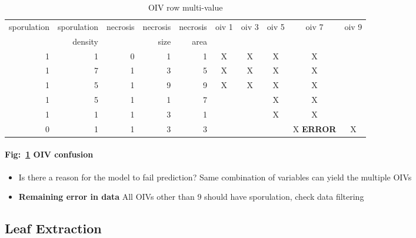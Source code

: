 \documentclass[english]{article}
\begin{document}
\begin{table}[H]
	\centering
	\caption{OIV row multi-value}\label{tab:oivconfusion}
	\begin{tabular}{rrrrrccccc}
		\toprule
		sporulation & sporulation & necrosis & necrosis & necrosis & oiv 1 & oiv 3 & oiv 5 & oiv 7            & oiv 9 \\
		{}          & density     & {}       & size     & area     & {}    & {}    & {}    & {}               & {}    \\
		\midrule
		1           & 1           & 0        & 1        & 1        & X     & X     & X     & X                &       \\
		1           & 7           & 1        & 3        & 5        & X     & X     & X     & X                &       \\
		1           & 5           & 1        & 9        & 9        & X     & X     & X     & X                &       \\
		1           & 5           & 1        & 1        & 7        &       &       & X     & X                &       \\
		1           & 1           & 1        & 3        & 1        &       &       & X     & X                &       \\
		0           & 1           & 1        & 3        & 3        &       &       &       & X \textbf{ERROR} & X     \\
		\bottomrule
	\end{tabular}
\end{table}
\paragraph{Fig:~\ref{tab:oivconfusion} OIV confusion}
\begin{itemize}
	\item Is there a reason for the model to fail prediction? Same combination of variables can yield the multiple OIVs
	\item \textbf{Remaining error in data} All OIVs other than 9 should have sporulation, check data filtering
\end{itemize}


\subsection{Leaf Extraction}
\end{document}
